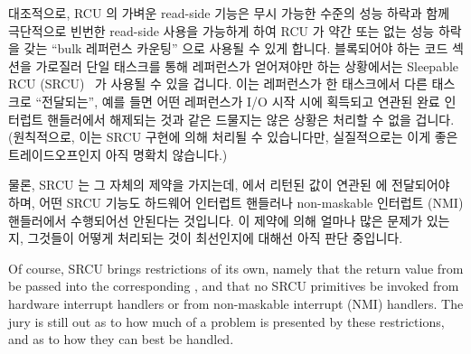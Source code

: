 대조적으로, RCU 의 가벼운 read-side 기능은 무시 가능한 수준의 성능 하락과 함께
극단적으로 빈번한 read-side 사용을 가능하게 하여 RCU 가 약간 또는 없는 성능
하락을 갖는 ``bulk 레퍼런스 카운팅'' 으로 사용될 수 있게 합니다.
블록되어야 하는 코드 섹션을 가로질러 단일 태스크를 통해 레퍼런스가 얻어져야만
하는 상황에서는 Sleepable RCU (SRCU)~\cite{PaulEMcKenney2006c} 가 사용될 수
있을 겁니다.
이는 레퍼런스가 한 태스크에서 다른 태스크로 ``전달되는'', 예를 들면 어떤
레퍼런스가 I/O 시작 시에 획득되고 연관된 완료 인터럽트 핸들러에서 해제되는 것과
같은 드물지는 않은 상황은 처리할 수 없을 겁니다.
(원칙적으로, 이는 SRCU 구현에 의해 처리될 수 있습니다만, 실질적으로는 이게 좋은
트레이드오프인지 아직 명확치 않습니다.)

물론, SRCU 는 그 자체의 제약을 가지는데,  에서 리턴된 값이
연관된  에 전달되어야 하며, 어떤 SRCU 기능도 하드웨어
인터럽트 핸들러나 non-maskable 인터럽트 (NMI) 핸들러에서 수행되어선 안된다는
것입니다.
이 제약에 의해 얼마나 많은 문제가 있는지, 그것들이 어떻게 처리되는 것이
최선인지에 대해선 아직 판단 중입니다.

\iffalse

Of course, SRCU brings restrictions of its own, namely that the
return value from  be passed into the
corresponding , and that no SRCU primitives
be invoked from hardware interrupt handlers or from non-maskable interrupt
(NMI) handlers.
The jury is still out as to how much of a problem is presented by
these restrictions, and as to how they can best be handled.

